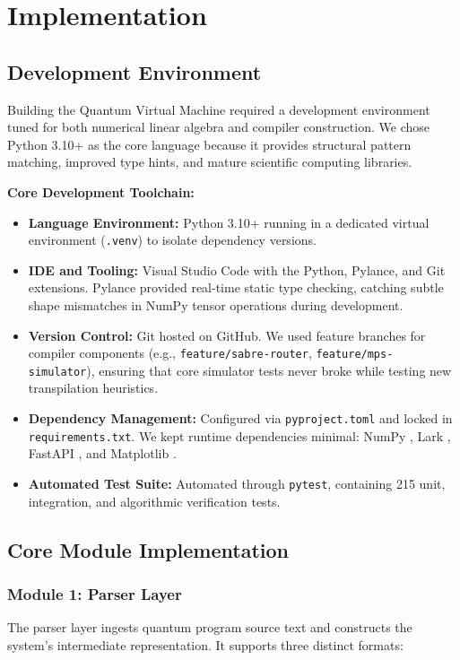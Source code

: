 \chapter{Implementation}

\section{Development Environment}
Building the Quantum Virtual Machine required a development environment tuned for both numerical linear algebra and compiler construction. We chose Python 3.10+ as the core language because it provides structural pattern matching, improved type hints, and mature scientific computing libraries.

\textbf{Core Development Toolchain:}
\begin{itemize}[leftmargin=*]
    \item \textbf{Language Environment:} Python 3.10+ running in a dedicated virtual environment (\texttt{.venv}) to isolate dependency versions.
    \item \textbf{IDE and Tooling:} Visual Studio Code with the Python, Pylance, and Git extensions. Pylance provided real-time static type checking, catching subtle shape mismatches in NumPy tensor operations during development.
    \item \textbf{Version Control:} Git hosted on GitHub. We used feature branches for compiler components (e.g., \texttt{feature/sabre-router}, \texttt{feature/mps-simulator}), ensuring that core simulator tests never broke while testing new transpilation heuristics.
    \item \textbf{Dependency Management:} Configured via \texttt{pyproject.toml} and locked in \texttt{requirements.txt}. We kept runtime dependencies minimal: NumPy \cite{numpy2020}, Lark \cite{lark2023}, FastAPI \cite{fastapi2023}, and Matplotlib \cite{matplotlib2007}.
    \item \textbf{Automated Test Suite:} Automated through \texttt{pytest}, containing 215 unit, integration, and algorithmic verification tests.
\end{itemize}

\section{Core Module Implementation}

\subsection{Module 1: Parser Layer}
The parser layer ingests quantum program source text and constructs the system's intermediate representation. It supports three distinct formats:

